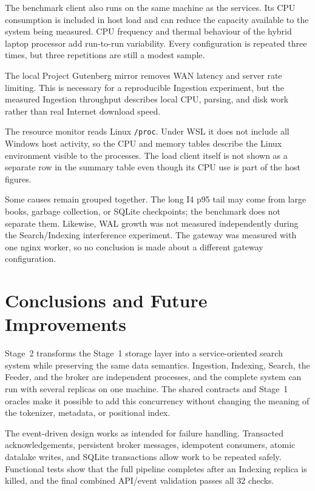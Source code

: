 \documentclass[12pt,a4paper]{article}
\begin{document}
The benchmark client also runs on the same machine as the services. Its CPU consumption is included
in host load and can reduce the capacity available to the system being measured. CPU frequency and
thermal behaviour of the hybrid laptop processor add run-to-run variability. Every configuration
is repeated three times, but three repetitions are still a modest sample.

The local Project Gutenberg mirror removes WAN latency and server rate limiting. This is necessary
for a reproducible Ingestion experiment, but the measured Ingestion throughput describes local
CPU, parsing, and disk work rather than real Internet download speed.

The resource monitor reads Linux \texttt{/proc}. Under WSL it does not include all Windows host
activity, so the CPU and memory tables describe the Linux environment visible to the processes.
The load client itself is not shown as a separate row in the summary table even though its CPU use
is part of the host figures.

Some causes remain grouped together. The long I4 p95 tail may come from large books, garbage
collection, or SQLite checkpoints; the benchmark does not separate them. Likewise, WAL growth was
not measured independently during the Search/Indexing interference experiment. The gateway was
measured with one nginx worker, so no conclusion is made about a different gateway configuration.

\section{Conclusions and Future Improvements}
Stage~2 transforms the Stage~1 storage layer into a service-oriented search system while
preserving the same data semantics. Ingestion, Indexing, Search, the Feeder, and the broker are
independent processes, and the complete system can run with several replicas on one machine. The
shared contracts and Stage~1 oracles make it possible to add this concurrency without changing the
meaning of the tokenizer, metadata, or positional index.

The event-driven design works as intended for failure handling. Transacted acknowledgements,
persistent broker messages, idempotent consumers, atomic datalake writes, and SQLite transactions
allow work to be repeated safely. Functional tests show that the full pipeline completes after an
Indexing replica is killed, and the final combined API/event validation passes all 32 checks.
\end{document}
